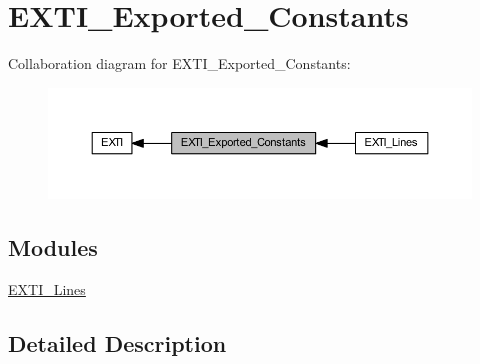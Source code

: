 \hypertarget{group___e_x_t_i___exported___constants}{}\section{E\+X\+T\+I\+\_\+\+Exported\+\_\+\+Constants}
\label{group___e_x_t_i___exported___constants}
Collaboration diagram for E\+X\+T\+I\+\_\+\+Exported\+\_\+\+Constants\+:
\nopagebreak
\begin{figure}[H]
\begin{center}
\leavevmode
\includegraphics[width=350pt]{group___e_x_t_i___exported___constants}
\end{center}
\end{figure}
\subsection*{Modules}
\begin{DoxyCompactItemize}
\item 
\hyperlink{group___e_x_t_i___lines}{E\+X\+T\+I\+\_\+\+Lines}
\end{DoxyCompactItemize}


\subsection{Detailed Description}
